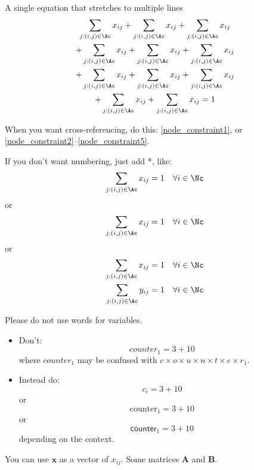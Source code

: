 \documentclass[letterpaper, 11pt]{article}
\renewcommand{\vec}[1]{\bm{#1}}
\newcommand{\mat}[1]{\bm{#1}}
\begin{document}
A single equation that stretches to multiple lines
\begin{multline}
	\sum_{j:(i,j)\in\Ac} x_{ij} + \sum_{j:(i,j)\in\Ac} x_{ij} + \sum_{j:(i,j)\in\Ac} x_{ij} \\
	+ \sum_{j:(i,j)\in\Ac} x_{ij} +	\sum_{j:(i,j)\in\Ac} x_{ij} + \sum_{j:(i,j)\in\Ac} x_{ij} \\
	+ \sum_{j:(i,j)\in\Ac} x_{ij} +	\sum_{j:(i,j)\in\Ac} x_{ij} + \sum_{j:(i,j)\in\Ac} x_{ij} \\
	+ \sum_{j:(i,j)\in\Ac} x_{ij} + \sum_{j:(i,j)\in\Ac} x_{ij} = 1 
\end{multline}

When you want cross-referencing, do this: \eqref{node_constraint1}, or \eqref{node_constraint2}--\eqref{node_constraint5}.

If you don't want numbering, just add *, like:
\begin{equation*}
	\sum_{j:(i,j)\in\Ac} x_{ij} = 1 \quad \forall i\in\Nc
\end{equation*}
or
\[
	\sum_{j:(i,j)\in\Ac} x_{ij} = 1 \quad \forall i\in\Nc
\]
or
\begin{align*}
	\sum_{j:(i,j)\in\Ac} x_{ij} = 1 \quad & \forall i\in\Nc \\
	\sum_{j:(i,j)\in\Ac} y_{ij} = 1 \quad & \forall i\in\Nc \\
\end{align*}

Please do not use words for variables. 
\begin{itemize}
\item Don't:
	\[
		counter_1 = 3 + 10 
	\]
	where $counter_1$ may be confused with $c \times o \times u \times n \times t \times e \times r_1$.

\item Instead do:
	\[
		c_i = 3 + 10
	\]
	or
	\[
		\text{counter}_1 = 3 + 10
	\]
	or
	\[
		\textsf{counter}_1 = 3 + 10
	\]
depending on the context.
\end{itemize}


You can use $\vec{x}$ as a vector of $x_{ij}$. Some matrices $\mat{A}$ and $\mat{B}$.
\end{document}
